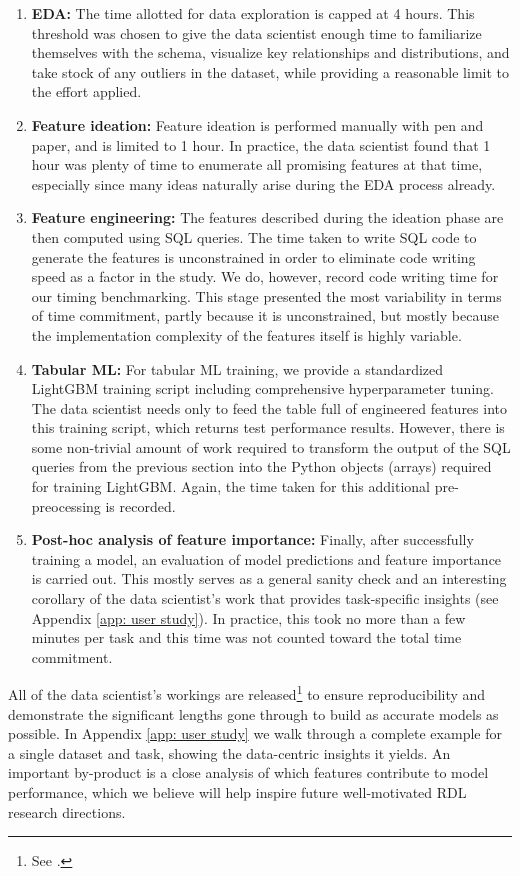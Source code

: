 \begin{enumerate}
\item \textbf{EDA:} The time allotted for data exploration is capped at 4 hours. This threshold was chosen to give the data scientist enough time to familiarize themselves with the schema, visualize key relationships and distributions, and take stock of any outliers in the dataset, while providing a reasonable limit to the effort applied.
\item \textbf{Feature ideation:} Feature ideation is performed manually with pen and paper, and is limited to 1 hour. In practice, the data scientist found that 1 hour was plenty of time to enumerate all promising features at that time, especially since many ideas naturally arise during the EDA process already.
\item \textbf{Feature engineering:} The features described during the ideation phase are then computed using SQL queries. The time taken to write SQL code to generate the features is unconstrained in order to eliminate code writing speed as a factor in the study. We do, however, record code writing time for our timing benchmarking. This stage presented the most variability in terms of time commitment, partly because it is unconstrained, but mostly because the implementation complexity of the features itself is highly variable.
\item \textbf{Tabular ML:} For tabular ML training, we provide a standardized LightGBM training script including comprehensive hyperparameter tuning. The data scientist needs only to feed the table full of engineered features into this training script, which returns test performance results. However, there is some non-trivial amount of work required to transform the output of the SQL queries from the previous section into the Python objects (arrays) required for training LightGBM. Again, the time taken for this additional pre-preocessing is recorded.
\item \textbf{Post-hoc analysis of feature importance:} Finally, after successfully training a model, an evaluation of model predictions and feature importance is carried out. This mostly serves as a general sanity check and an interesting corollary of the data scientist’s work that provides task-specific insights (see Appendix \ref{app: user study}). In practice, this took no more than a few minutes per task and this time was not counted toward the total time commitment.
\end{enumerate}


  All of the data scientist's workings are released\footnote{See \userstudy.} to ensure reproducibility and demonstrate the significant lengths gone through to build as accurate models as possible. In Appendix \ref{app: user study} we walk through a complete example for a single dataset and task, showing the data-centric insights it yields. An important by-product is a close analysis of which features contribute to model performance, which we believe will help inspire future well-motivated RDL research directions. 



